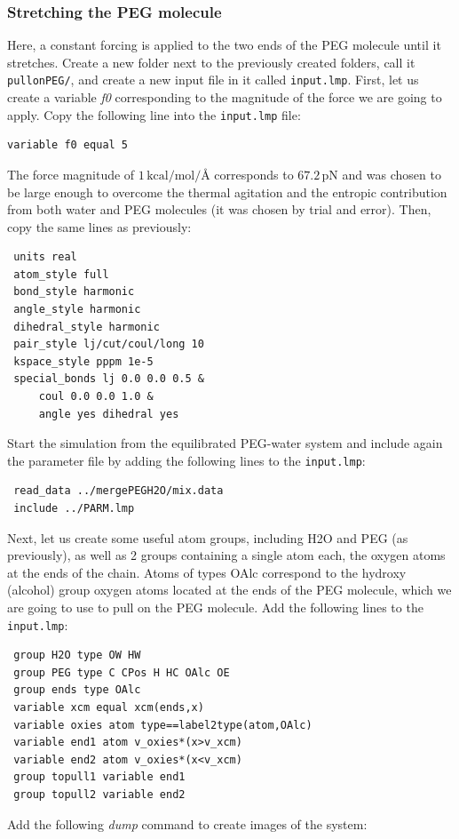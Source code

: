 \documentclass[9pt,tutorial]{livecoms}
\newcommand{\flrcmd}[1]{\textcolor{command}{\texttt{#1}}} %
\newcommand{\flecmd}[1]{\textcolor{command}{\texttt{#1}}} %
\begin{document}
\subsubsection{Stretching the PEG molecule}
Here, a constant forcing is applied to the two ends of the PEG molecule until it
stretches. Create a new folder next to the previously created folders, call it
\flrcmd{pullonPEG/}, and create a new input file in it called \flecmd{input.lmp}.
First, let us create a variable \textit{f0} corresponding to the magnitude of the
force we are going to apply. Copy the following line into the \flecmd{input.lmp} file:
\begin{lstlisting}
variable f0 equal 5
\end{lstlisting}
The force magnitude of $1\,\text{kcal/mol/\AA{}}$ corresponds to $67.2\,\text{pN}$
and was chosen to be large enough to overcome the thermal agitation and the entropic
contribution from both water and PEG molecules (it was chosen by trial and error).
Then, copy the same lines as previously:
\begin{lstlisting}
 units real
 atom_style full
 bond_style harmonic
 angle_style harmonic
 dihedral_style harmonic
 pair_style lj/cut/coul/long 10
 kspace_style pppm 1e-5
 special_bonds lj 0.0 0.0 0.5 &
     coul 0.0 0.0 1.0 &
     angle yes dihedral yes
\end{lstlisting}
Start the simulation from the equilibrated PEG-water system and include again the
parameter file by adding the following lines to the \flecmd{input.lmp}:
\begin{lstlisting}
 read_data ../mergePEGH2O/mix.data
 include ../PARM.lmp
\end{lstlisting}
Next, let us create some useful atom groups, including H2O and PEG (as previously),
as well as 2 groups containing a single atom each, the oxygen atoms at the ends
of the chain. Atoms of types OAlc correspond to the hydroxy (alcohol) group oxygen
atoms located at the ends of the PEG molecule, which we are going to use to pull
on the PEG molecule. Add the following lines to the \flecmd{input.lmp}:
\begin{lstlisting}
 group H2O type OW HW
 group PEG type C CPos H HC OAlc OE
 group ends type OAlc
 variable xcm equal xcm(ends,x)
 variable oxies atom type==label2type(atom,OAlc)
 variable end1 atom v_oxies*(x>v_xcm)
 variable end2 atom v_oxies*(x<v_xcm)
 group topull1 variable end1
 group topull2 variable end2
\end{lstlisting}
Add the following \textit{dump} command to create images of the system:
\end{document}
